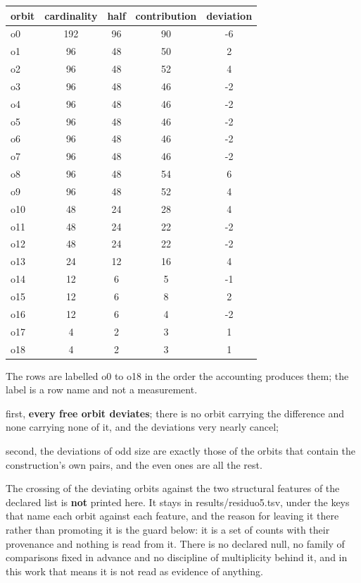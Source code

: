 \documentclass[11pt,a4paper]{article}
\begin{document}
\begingroup\footnotesize\setlength{\tabcolsep}{4pt}
\begin{longtable}[c]{lcccc}
\textbf{orbit} & \textbf{cardinality} & \textbf{half} & \textbf{contribution} & \textbf{deviation} \\
\hline
o0 & 192 & 96 & 90 & -6 \\
o1 & 96 & 48 & 50 & 2 \\
o2 & 96 & 48 & 52 & 4 \\
o3 & 96 & 48 & 46 & -2 \\
o4 & 96 & 48 & 46 & -2 \\
o5 & 96 & 48 & 46 & -2 \\
o6 & 96 & 48 & 46 & -2 \\
o7 & 96 & 48 & 46 & -2 \\
o8 & 96 & 48 & 54 & 6 \\
o9 & 96 & 48 & 52 & 4 \\
o10 & 48 & 24 & 28 & 4 \\
o11 & 48 & 24 & 22 & -2 \\
o12 & 48 & 24 & 22 & -2 \\
o13 & 24 & 12 & 16 & 4 \\
o14 & 12 & 6 & 5 & -1 \\
o15 & 12 & 6 & 8 & 2 \\
o16 & 12 & 6 & 4 & -2 \\
o17 & 4 & 2 & 3 & 1 \\
o18 & 4 & 2 & 3 & 1 \\
\end{longtable}
\endgroup

The rows are labelled o0 to o18 in the order the accounting produces them; the label is a row name and not a measurement.

first, \textbf{every free orbit deviates}; there is no orbit carrying the difference and none carrying none of it, and the deviations very nearly cancel;

second, the deviations of odd size are exactly those of the orbits that contain the construction's own pairs, and the even ones are all the rest.

The crossing of the deviating orbits against the two structural features of the declared list is \textbf{not} printed here. It stays in results/residuo5.tsv, under the keys that name each orbit against each feature, and the reason for leaving it there rather than promoting it is the guard below: it is a set of counts with their provenance and nothing is read from it. There is no declared null, no family of comparisons fixed in advance and no discipline of multiplicity behind it, and in this work that means it is not read as evidence of anything.
\end{document}
